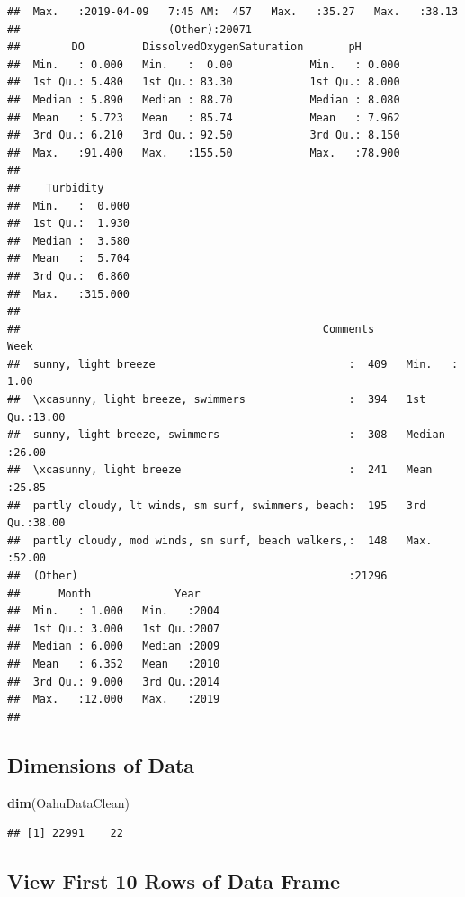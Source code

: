 \documentclass[12pt,]{article}
\newenvironment{Shaded}{\begin{snugshade}}{\end{snugshade}}
\newcommand{\KeywordTok}[1]{\textcolor[rgb]{0.13,0.29,0.53}{\textbf{#1}}}
\newcommand{\NormalTok}[1]{#1}
\begin{document}
\begin{verbatim}
##  Max.   :2019-04-09   7:45 AM:  457   Max.   :35.27   Max.   :38.13  
##                       (Other):20071                                  
##        DO         DissolvedOxygenSaturation       pH        
##  Min.   : 0.000   Min.   :  0.00            Min.   : 0.000  
##  1st Qu.: 5.480   1st Qu.: 83.30            1st Qu.: 8.000  
##  Median : 5.890   Median : 88.70            Median : 8.080  
##  Mean   : 5.723   Mean   : 85.74            Mean   : 7.962  
##  3rd Qu.: 6.210   3rd Qu.: 92.50            3rd Qu.: 8.150  
##  Max.   :91.400   Max.   :155.50            Max.   :78.900  
##                                                             
##    Turbidity      
##  Min.   :  0.000  
##  1st Qu.:  1.930  
##  Median :  3.580  
##  Mean   :  5.704  
##  3rd Qu.:  6.860  
##  Max.   :315.000  
##                   
##                                               Comments          Week      
##  sunny, light breeze                              :  409   Min.   : 1.00  
##  \xcasunny, light breeze, swimmers                :  394   1st Qu.:13.00  
##  sunny, light breeze, swimmers                    :  308   Median :26.00  
##  \xcasunny, light breeze                          :  241   Mean   :25.85  
##  partly cloudy, lt winds, sm surf, swimmers, beach:  195   3rd Qu.:38.00  
##  partly cloudy, mod winds, sm surf, beach walkers,:  148   Max.   :52.00  
##  (Other)                                          :21296                  
##      Month             Year     
##  Min.   : 1.000   Min.   :2004  
##  1st Qu.: 3.000   1st Qu.:2007  
##  Median : 6.000   Median :2009  
##  Mean   : 6.352   Mean   :2010  
##  3rd Qu.: 9.000   3rd Qu.:2014  
##  Max.   :12.000   Max.   :2019  
## 
\end{verbatim}

\subsection{Dimensions of Data}\label{dimensions-of-data}

\begin{Shaded}
\begin{Highlighting}[]
\KeywordTok{dim}\NormalTok{(OahuDataClean)}
\end{Highlighting}
\end{Shaded}

\begin{verbatim}
## [1] 22991    22
\end{verbatim}

\subsection{View First 10 Rows of Data
Frame}\label{view-first-10-rows-of-data-frame}
\end{document}
